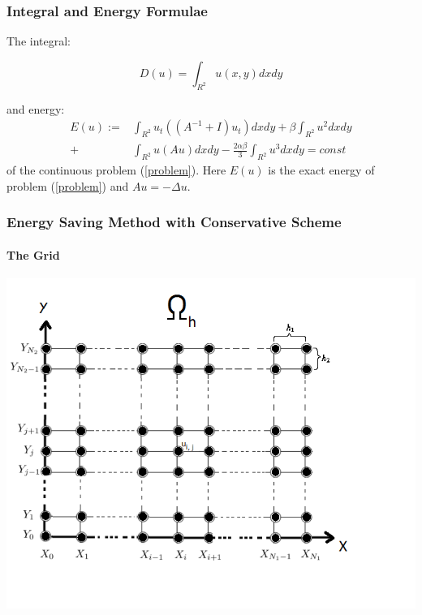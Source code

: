 \documentclass{beamer}
\newcommand{\rf}[1]{(\ref{#1})}
\begin{document}
\begin{frame}
\frametitle{Integral and Energy Formulae}
The integral:

\begin{equation}\label{int}
D(u)=\int_{R^2} u(x,y)dx dy
\end{equation}

and energy:
\begin{align}\label{ex-en}
E(u):=&\int_{R^2} u_t \left((A^{-1}+I)u_t\right) dxdy+
\beta \int_{R^2} u^2 dxdy \nonumber\\
+& \int_{R^2}u \left(A u\right) dxdy
-\frac{2 \alpha \beta}{3} \int_{R^2} u^3 dxdy =const
\end{align}
of the continuous problem \rf{problem}. Here $E(u)$ is the exact energy of problem \rf{problem} and $Au=-\Delta u$.
\end{frame}

\begin{frame}
\frametitle{Energy Saving Method with Conservative Scheme}
\framesubtitle{The Grid}

\begin{center}\vspace{0.4cm}
	\begin{minipage}[b]{0.6\linewidth}
		\includegraphics[width=\linewidth]{Omega_dah.png}
	\end{minipage}
\end{center}

\end{frame}
\end{document}
